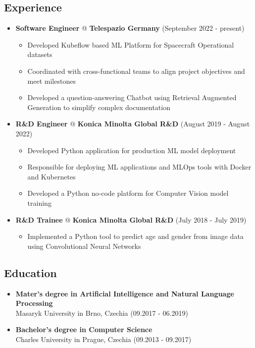\documentclass[a4paper,12pt]{article}
\begin{document}
{\color{myblue}
\subsection*{Experience}\label{work}
}
\begin{itemize}
\item
  \textbf{Software Engineer} @ \textbf{Telespazio Germany} \hfill (September 2022 - present)
  \begin{itemize}
      \item Developed Kubeflow based ML Platform for Spacecraft Operational datasets
      \item Coordinated with cross-functional teams to align project objectives and meet milestones
      \item Developed a question-answering Chatbot using Retrieval Augmented Generation to simplify complex documentation
  \end{itemize}
\item
  \textbf{R\&D Engineer} @ \textbf{Konica Minolta Global R\&D} \hfill (August 2019 - August 2022)
  \begin{itemize}
      \item Developed Python application for production ML model deployment
      \item Responsible for deploying ML applications and MLOps tools with Docker and Kubernetes
      \item Developed a Python no-code platform for Computer Vision model training
  \end{itemize}
\item
  \textbf{R\&D Trainee} @ \textbf{Konica Minolta Global R\&D} \hfill (July 2018 - July 2019)
  \begin{itemize}
      \item Implemented a Python tool to predict age and gender from image data using Convolutional Neural Networks
  \end{itemize}
\end{itemize}

{\color{myblue}
\subsection*{Education}\label{education}
}
\begin{itemize}
\item
  \textbf{Mater's degree in Artificial Intelligence and Natural Language Processing}\\
  Masaryk University in Brno, Czechia \hfill (09.2017 - 06.2019)
\item
  \textbf{Bachelor's degree in Computer Science}\\
  Charles University in Prague, Czechia \hfill (09.2013 - 09.2017)
\end{itemize}
\end{document}
